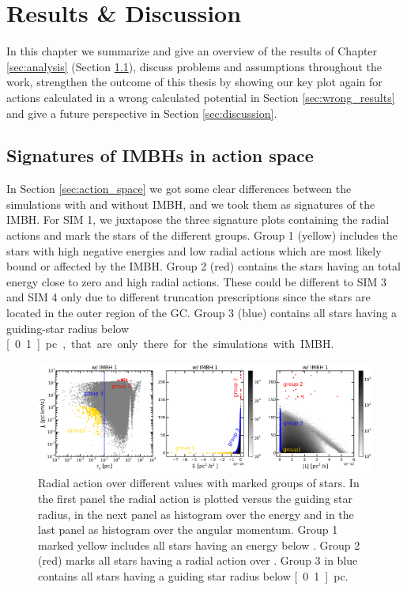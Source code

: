 \section{Results \& Discussion}
In this chapter we summarize and give an overview of the results of Chapter \ref{sec:analysis} (Section \ref{sec:results}), discuss problems and assumptions throughout the work, strengthen the outcome of this thesis by showing our key plot again for actions calculated in a wrong calculated potential in Section \ref{sec:wrong_results} and give a future perspective in Section \ref{sec:discussion}.

\subsection{Signatures of \aclp{IMBH} in action space}\label{sec:results}
In Section \ref{sec:action_space} we got some clear differences between the simulations with and without \ac{IMBH}, and we took them as signatures of the \ac{IMBH}. For SIM 1, we juxtapose the three signature plots containing the radial actions and mark the stars of the different groups. Group 1 (yellow) includes the stars with high negative energies and low radial actions which are most likely bound or affected by the \ac{IMBH}. Group 2 (red) contains the stars having an total energy close to zero and high radial actions. These could be different to SIM 3 and SIM 4 only due to different truncation prescriptions since the stars are located in the outer region of the \acs{GC}. Group 3 (blue) contains all stars having a guiding-star radius below \unit[0.1]{pc}, that are only there for the simulations with \ac{IMBH}. 
\begin{figure}[htbp]
\centering
\includegraphics[width=\textwidth]{Plots/J_r_compare_plot.png}
\caption{Radial action over different values with marked groups of stars. In the first panel the radial action is plotted versus the guiding star radius, in the next panel as histogram over the energy and in the last panel as histogram over the angular momentum. Group 1 marked yellow includes all stars having an energy below . Group 2 (red) marks all stars having a radial action over . Group 3 in blue contains all stars having a guiding star radius below \unit[0.1]{pc}.}
\label{fig:J_r_compare}
\end{figure}
